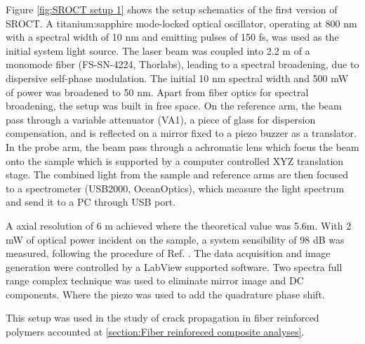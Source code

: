 \documentclass[12pt,twoside,english]{book}
\renewcommand{\~}{\perispomeni}%
\DeclareRobustCommand{\textgreek}[1]{\leavevmode{\greektext #1}}
\numberwithin{equation}{section}
\numberwithin{figure}{section}
\begin{document}
Figure \ref{fig:SROCT setup 1} shows the setup schematics of the first version of SROCT. A titanium:sapphire mode-locked optical oscillator, operating at 800 nm with a spectral width of 10 nm and emitting pulses of 150 fs, was used as the initial system light source. The laser beam was coupled into 2.2 m of a monomode fiber (FS-SN-4224, Thorlabs), leading to a spectral broadening, due to dispersive self-phase modulation\cite{Hsu:2002p2439}. The initial 10 nm spectral width and 500 mW of power was broadened to 50 nm. Apart from fiber optics for spectral broadening, the setup was built in free space. On the reference arm, the beam pass through a variable attenuator (VA1), a piece of glass for dispersion compensation, and is reflected on a mirror fixed to a piezo buzzer as a translator. In the probe arm, the beam pass through a achromatic lens which focus the beam onto the sample which is supported by a computer controlled XYZ translation stage. The combined light from the sample and reference arms are then focused to a spectrometer (USB2000, OceanOptics), which measure the light spectrum and send it to a PC through USB port.

A axial resolution of 6 \textgreek{m}m achieved where the theoretical value was 5.6\textgreek{m}m. With 2 mW of optical power incident on the sample, a system sensibility of 98 dB was measured, following the procedure of Ref. \cite{Leitgeb:2003p1678}. The data acquisition and image generation were controlled by a LabView supported software. Two spectra full range complex technique was used to eliminate mirror image and DC components. Where the piezo was used to add the quadrature phase shift. 

This setup was used in the study of crack propagation in fiber reinforced polymers accounted at \ref{section:Fiber reinforeced composite analyses}.

\end{document}
